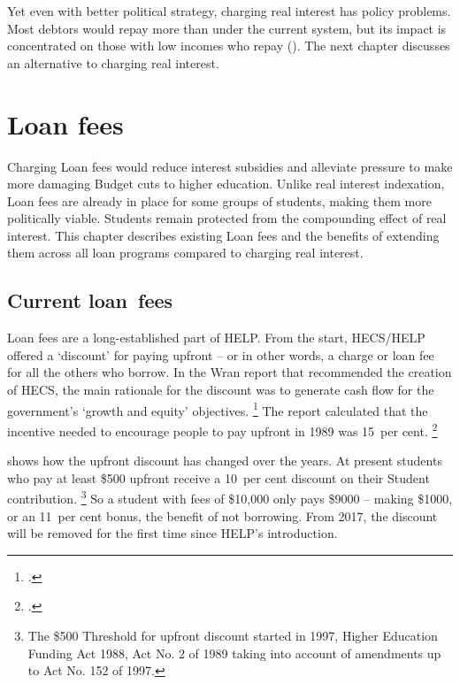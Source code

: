 \documentclass[embargoed]{grattan}
\begin{document}
Yet even with better political strategy, charging real interest has policy problems.
Most debtors would repay more than under the current system, but its impact is concentrated on those with low incomes who repay ().
The next chapter discusses an alternative to charging real interest.

\chapter{Loan fees}\label{chap:6-loan-fee}

Charging \gls{Loan fees} would reduce interest subsidies and alleviate pressure to make more damaging Budget cuts to higher education.
Unlike real interest indexation, \gls{Loan fees} are already in place for some groups of students, making them more politically viable.
Students remain protected from the compounding effect of real interest.
This chapter describes existing \gls{Loan fees} and the benefits of extending them across all loan programs compared to charging real interest.

\section{Current loan~fees}\label{sec:current-loan-fees}

\Gls{Loan fees} are a long-established part of \gls{HELP}\@.
From the start, \gls{HECS}/\gls{HELP} offered a `discount' for paying upfront -- or in other words, a charge or loan fee for all the others who borrow.
In the Wran report that recommended the creation of \gls{HECS}, the main rationale for the discount was to generate cash flow for the government's `growth and equity' objectives.%
\footcite[][79]{Wran1988ReportCommitteeHigher} %
The report calculated that the incentive needed to encourage people to pay upfront in 1989 was 15~per cent.%
\footcite[][93--94]{Wran1988ReportCommitteeHigher} 

 shows how the upfront discount has changed over the years.
At present students who pay at least \$500 upfront receive a 10~per cent discount on their \gls{Student contribution}.%
\footnote{The \$500 \gls{Threshold} for upfront discount started in 1997, Higher Education Funding Act 1988, Act No. 2 of 1989 taking into account of amendments up to Act No. 152 of 1997.} So a student with fees of \$10,000 only pays \$9000 -- making \$1000, or an 11~per cent bonus, the benefit of not borrowing.
From 2017, the discount will be removed for the first time since \gls{HELP}'s introduction.
\end{document}

